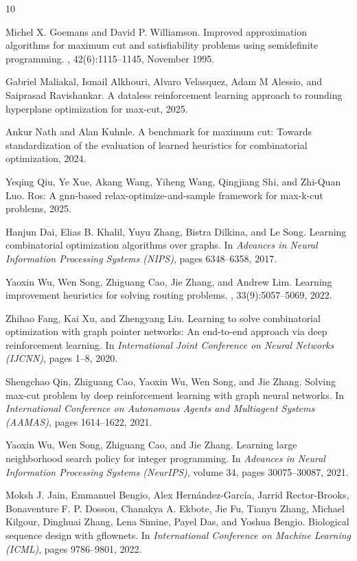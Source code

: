 \documentclass{article}
\begin{document}
\begin{thebibliography}{10}

Michel X. Goemans and David P. Williamson.
\newblock Improved approximation algorithms for maximum cut and satisfiability problems using semidefinite programming.
, 42(6):1115--1145, November 1995.

Gabriel Maliakal, Ismail Alkhouri, Alvaro Velasquez, Adam M Alessio, and Saiprasad Ravishankar.
\newblock A dataless reinforcement learning approach to rounding hyperplane optimization for max-cut, 2025.

Ankur Nath and Alan Kuhnle.
\newblock A benchmark for maximum cut: Towards standardization of the evaluation of learned heuristics for combinatorial optimization, 2024.

Yeqing Qiu, Ye Xue, Akang Wang, Yiheng Wang, Qingjiang Shi, and Zhi-Quan Luo.
\newblock Ros: A gnn-based relax-optimize-and-sample framework for max-k-cut problems, 2025.

Hanjun Dai, Elias B. Khalil, Yuyu Zhang, Bistra Dilkina, and Le Song.
\newblock Learning combinatorial optimization algorithms over graphs.
\newblock In {\em Advances in Neural Information Processing Systems (NIPS)}, pages 6348--6358, 2017.

Yaoxin Wu, Wen Song, Zhiguang Cao, Jie Zhang, and Andrew Lim.
\newblock Learning improvement heuristics for solving routing problems.
, 33(9):5057--5069, 2022.

Zhihao Fang, Kai Xu, and Zhengyang Liu.
\newblock Learning to solve combinatorial optimization with graph pointer networks: An end-to-end approach via deep reinforcement learning.
\newblock In {\em International Joint Conference on Neural Networks (IJCNN)}, pages 1--8, 2020.

Shengchao Qin, Zhiguang Cao, Yaoxin Wu, Wen Song, and Jie Zhang.
\newblock Solving max-cut problem by deep reinforcement learning with graph neural networks.
\newblock In {\em International Conference on Autonomous Agents and Multiagent Systems (AAMAS)}, pages 1614--1622, 2021.

Yaoxin Wu, Wen Song, Zhiguang Cao, and Jie Zhang.
\newblock Learning large neighborhood search policy for integer programming.
\newblock In {\em Advances in Neural Information Processing Systems (NeurIPS)}, volume 34, pages 30075--30087, 2021.

Moksh J. Jain, Emmanuel Bengio, Alex Hernández-García, Jarrid Rector-Brooks, Bonaventure F. P. Dossou, Chanakya A. Ekbote, Jie Fu, Tianyu Zhang, Michael Kilgour, Dinghuai Zhang, Lena Simine, Payel Das, and Yoshua Bengio.
\newblock Biological sequence design with gflownets.
\newblock In {\em International Conference on Machine Learning (ICML)}, pages 9786--9801, 2022.

\end{thebibliography}
\end{document}
